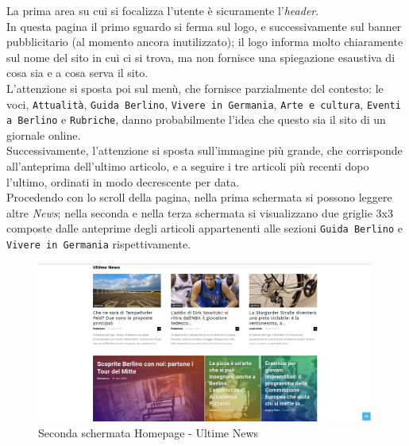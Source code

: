La prima area su cui si focalizza l'utente è sicuramente l'\textit{header}. \\
In questa pagina il primo sguardo si ferma sul logo, e successivamente sul banner pubblicitario (al momento ancora inutilizzato); il logo informa molto chiaramente sul nome del sito in cui ci si trova, ma non fornisce una spiegazione esaustiva di cosa sia e a cosa serva il sito. \\
L'attenzione si sposta poi sul menù, che fornisce parzialmente del contesto: le voci, \texttt{Attualità}, \texttt{Guida Berlino}, \texttt{Vivere in Germania}, \texttt{Arte e cultura}, \texttt{Eventi a Berlino} e \texttt{Rubriche}, danno probabilmente l'idea che questo sia il sito di un giornale online. \\
Successivamente, l'attenzione si sposta sull'immagine più grande, che corrisponde all'anteprima dell'ultimo articolo, e a seguire i tre articoli più recenti dopo l'ultimo, ordinati in modo decrescente per data. \\
Procedendo con lo scroll della pagina, nella prima schermata si possono leggere altre \textit{News}; nella seconda e nella terza schermata si visualizzano due griglie 3x3 composte dalle anteprime degli articoli appartenenti alle sezioni \texttt{Guida Berlino} e \texttt{Vivere in Germania} rispettivamente. \\

\vspace{30pt}
\begin{figure}[htbp]
\begin{center}
\includegraphics[width=30em]{img/home2}
\caption{Seconda schermata Homepage - Ultime News}
\end{center}
\end{figure}
\vspace{30pt}

